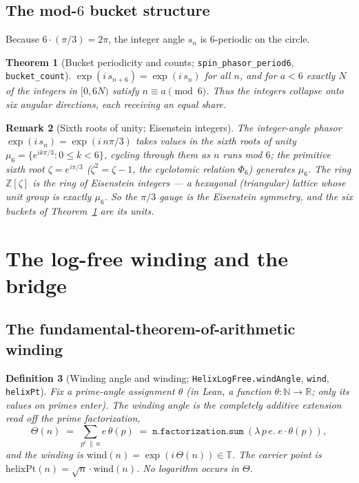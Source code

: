 \documentclass[11pt]{article}
\newtheorem{definition}{Definition}[section]
\newtheorem{theorem}[definition]{Theorem}
\newtheorem{remark}[definition]{Remark}
\newcommand{\R}{\mathbb{R}}
\newcommand{\N}{\mathbb{N}}
\newcommand{\Z}{\mathbb{Z}}
\newcommand{\T}{\mathbb{T}}
\newcommand{\code}[1]{\texttt{#1}}
\begin{document}
\subsection{The mod-$6$ bucket structure}

Because $6\cdot(\pi/3)=2\pi$, the integer angle $s_n$ is $6$-periodic on the circle.

\begin{theorem}[Bucket periodicity and counts; \code{spin\_phasor\_period6}, \code{bucket\_count}]\label{thm:buckets}
$\exp(i\,s_{n+6})=\exp(i\,s_n)$ for all $n$, and for $a<6$ exactly $N$ of the integers in
$[0,6N)$ satisfy $n\equiv a\pmod 6$. Thus the integers collapse onto six angular directions,
each receiving an equal share.
\end{theorem}

\begin{remark}[Sixth roots of unity; Eisenstein integers]\label{rem:eisenstein}
The integer-angle phasor $\exp(i\,s_n)=\exp(i\,n\pi/3)$ takes values in the sixth roots of unity
$\mu_6=\{e^{ik\pi/3}:0\le k<6\}$, cycling through them as $n$ runs mod $6$; the primitive sixth root
$\zeta=e^{i\pi/3}$ ($\zeta^2=\zeta-1$, the cyclotomic relation $\Phi_6$) generates $\mu_6$. The ring
$\Z[\zeta]$ is the ring of Eisenstein integers \cite{IrelandRosen1990} --- a hexagonal (triangular)
lattice whose unit group
is exactly $\mu_6$. So the $\pi/3$ gauge is the Eisenstein symmetry, and the six buckets of
Theorem~\ref{thm:buckets} are its units.
\end{remark}

\section{The log-free winding and the bridge}\label{sec:winding}

\subsection{The fundamental-theorem-of-arithmetic winding}

\begin{definition}[Winding angle and winding; \code{HelixLogFree.windAngle}, \code{wind}, \code{helixPt}]\label{def:wind}
Fix a prime-angle assignment $\theta$ (in Lean, a function $\theta:\N\to\R$; only its values on primes
enter).
The \emph{winding angle} is the completely additive extension read off the prime factorization,
\[
  \Theta(n) \;=\; \sum_{p^{e}\,\|\,n} e\,\theta(p)
  \;=\; \code{n.factorization.sum}\ (\lambda\, p\, e.\; e\cdot\theta(p)),
\]
and the \emph{winding} is $\mathrm{wind}(n)=\exp(i\,\Theta(n))\in\T$. The carrier point is
$\mathrm{helixPt}(n)=\sqrt n\cdot \mathrm{wind}(n)$. No logarithm occurs in $\Theta$.
\end{definition}
\end{document}

